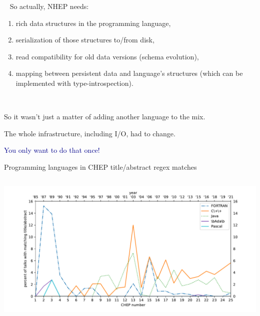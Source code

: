 \documentclass[aspectratio=169]{beamer}
\begin{document}
\begin{frame}{\mbox{ }}
\Large
\vspace{0.25 cm}
So actually, NHEP needs:

\vspace{0.25 cm}
\begin{enumerate}\setlength{\itemsep}{0.15 cm}
\item rich data structures in the programming language,
\item serialization of those structures to/from disk,
\item read compatibility for old data versions (schema evolution),
\item mapping between persistent data and language's structures (which can be implemented with type-introspection).
\end{enumerate}

\large
\vspace{0.5 cm}

\vspace{0.25 cm}

\vspace{0.25 cm}
\end{frame}

\begin{frame}{\mbox{ }}
\vspace{0.35 cm}
\Large
\begin{center}
So it wasn't just a matter of adding another language to the mix.

\vspace{1 cm}
The whole infrastructure, including I/O, had to change.

\vspace{1 cm}
\textcolor{darkblue}{You only want to do that once!}
\end{center}
\end{frame}

\begin{frame}{Programming languages in CHEP title/abstract regex matches}
\vspace{0.15 cm}
\begin{columns}
\includegraphics[width=\linewidth]{PLOTS/chep-papers-language-1.pdf}
\end{columns}
\end{frame}
\end{document}
